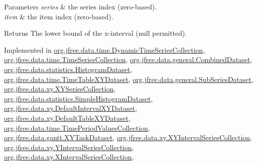 \begin{DoxyParams}{Parameters}
{\em series} & the series index (zero-\/based). \\
\hline
{\em item} & the item index (zero-\/based).\\
\hline
\end{DoxyParams}
\begin{DoxyReturn}{Returns}
The lower bound of the x-\/interval ({\ttfamily null} permitted). 
\end{DoxyReturn}


Implemented in \mbox{\hyperlink{classorg_1_1jfree_1_1data_1_1time_1_1_dynamic_time_series_collection_ac8f51b76cc0eede515c78e4cd22e7c53}{org.\+jfree.\+data.\+time.\+Dynamic\+Time\+Series\+Collection}}, \mbox{\hyperlink{classorg_1_1jfree_1_1data_1_1time_1_1_time_series_collection_a20209bf09ed5d7d58e01508a6a53a5fa}{org.\+jfree.\+data.\+time.\+Time\+Series\+Collection}}, \mbox{\hyperlink{classorg_1_1jfree_1_1data_1_1general_1_1_combined_dataset_ac4979232d9b53df764eb427259e2b104}{org.\+jfree.\+data.\+general.\+Combined\+Dataset}}, \mbox{\hyperlink{classorg_1_1jfree_1_1data_1_1statistics_1_1_histogram_dataset_aeac47110575d30da4a60153d8842a6da}{org.\+jfree.\+data.\+statistics.\+Histogram\+Dataset}}, \mbox{\hyperlink{classorg_1_1jfree_1_1data_1_1time_1_1_time_table_x_y_dataset_a9af3bf40e3d723b5aad9470417154183}{org.\+jfree.\+data.\+time.\+Time\+Table\+X\+Y\+Dataset}}, \mbox{\hyperlink{classorg_1_1jfree_1_1data_1_1general_1_1_sub_series_dataset_a81fe209cb69474ae0af304d45aeec686}{org.\+jfree.\+data.\+general.\+Sub\+Series\+Dataset}}, \mbox{\hyperlink{classorg_1_1jfree_1_1data_1_1xy_1_1_x_y_series_collection_a6dc884bc2770f807b86b560a025f708b}{org.\+jfree.\+data.\+xy.\+X\+Y\+Series\+Collection}}, \mbox{\hyperlink{classorg_1_1jfree_1_1data_1_1statistics_1_1_simple_histogram_dataset_a9db41ff665f21bedc22f0e5514dd52d8}{org.\+jfree.\+data.\+statistics.\+Simple\+Histogram\+Dataset}}, \mbox{\hyperlink{classorg_1_1jfree_1_1data_1_1xy_1_1_default_interval_x_y_dataset_af1221379a4ac6d470d0b901b80841940}{org.\+jfree.\+data.\+xy.\+Default\+Interval\+X\+Y\+Dataset}}, \mbox{\hyperlink{classorg_1_1jfree_1_1data_1_1xy_1_1_default_table_x_y_dataset_a19b5ac6d388445218c7f0a2cdf2a29af}{org.\+jfree.\+data.\+xy.\+Default\+Table\+X\+Y\+Dataset}}, \mbox{\hyperlink{classorg_1_1jfree_1_1data_1_1time_1_1_time_period_values_collection_aa36a15fdb6ff28968edd997f317c27c5}{org.\+jfree.\+data.\+time.\+Time\+Period\+Values\+Collection}}, \mbox{\hyperlink{classorg_1_1jfree_1_1data_1_1gantt_1_1_x_y_task_dataset_afd4c9a195a8fd2699ed927b6c4f717c4}{org.\+jfree.\+data.\+gantt.\+X\+Y\+Task\+Dataset}}, \mbox{\hyperlink{classorg_1_1jfree_1_1data_1_1xy_1_1_x_y_interval_series_collection_af5acf7bf95c09bf1550d5d6a05f6ce4b}{org.\+jfree.\+data.\+xy.\+X\+Y\+Interval\+Series\+Collection}}, \mbox{\hyperlink{classorg_1_1jfree_1_1data_1_1xy_1_1_y_interval_series_collection_a9675b5f0ee4eb7b9e0478844d2df61d0}{org.\+jfree.\+data.\+xy.\+Y\+Interval\+Series\+Collection}}, \mbox{\hyperlink{classorg_1_1jfree_1_1data_1_1xy_1_1_x_interval_series_collection_a253894bbb8b5b711cb26a9a13f776bc7}{org.\+jfree.\+data.\+xy.\+X\+Interval\+Series\+Collection}}, 